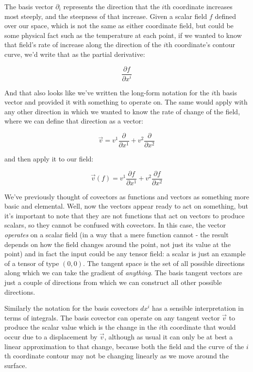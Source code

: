 The basis vector $\partial_i$ represents the direction that the $i$th coordinate increases most steeply, and the steepness of that increase. Given a scalar field $f$ defined over our space, which is not the same as either coordinate field, but could be some physical fact such as the temperature at each point, if we wanted to know that field's rate of increase along the direction of the $i$th coordinate's contour curve, we'd write that as the partial derivative:

$$
\frac{\partial f}{\partial x^i}
$$

And that also looks like we've written the long-form notation for the $i$th basis vector and provided it with something to operate on. The same would apply with any other direction in which we wanted to know the rate of change of the field, where we can define that direction as a vector:

$$
\vec{v} 
= 
v^1 \frac{\partial}{\partial x^1}
+
v^2 \frac{\partial}{\partial x^2}
$$

and then apply it to our field:

$$
\vec{v}(f)
= 
v^1 \frac{\partial f}{\partial x^1}
+
v^2 \frac{\partial f}{\partial x^2}
$$

We've previously thought of covectors as functions and vectors as something more basic and elemental. Well, now the vectors appear ready to act on something, but it's important to note that they are not functions that act on vectors to produce scalars, so they cannot be confused with covectors. In this case, the vector \textit{operates} on a scalar field (in a way that a mere function cannot - the result depends on how the field changes around the point, not just its value at the point) and in fact the input could be any tensor field: a scalar is just an example of a tensor of type $(0, 0)$. The tangent space is the set of all possible directions along which we can take the gradient of \textit{anything}. The basis tangent vectors are just a couple of directions from which we can construct all other possible directions.

Similarly the notation for the basis covectors $dx^i$ has a sensible interpretation in terms of integrals. The basis covector can operate on any tangent vector $\vec{v}$ to produce the scalar value which is the change in the $i$th coordinate that would occur due to a displacement by $\vec{v}$, although as usual it can only be at best a linear approximation to that change, because both the field and the curve of the $i$th coordinate contour may not be changing linearly as we move around the surface.

